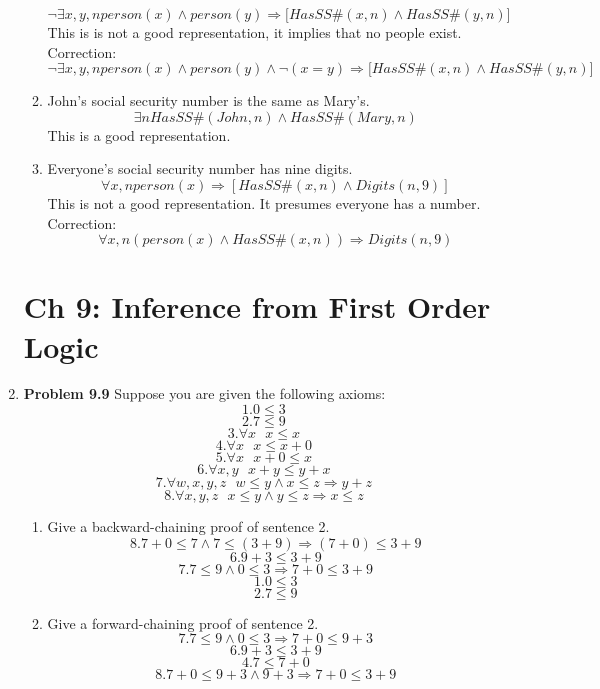 \documentclass[10pt]{article}
\begin{document}
\begin{enumerate}
\begin{enumerate}
    \[ \lnot \exists x,y,n person(x) \wedge person(y) \Rightarrow \big[HasSS\#(x,n) \wedge HasSS\#(y,n)\big] \]
    This is is not a good representation, it implies that no people exist. Correction:
    \[ \lnot \exists x,y,n person(x) \wedge person(y) \wedge \lnot(x=y) \Rightarrow \big[HasSS\#(x,n) \wedge HasSS\#(y,n)\big] \]
  \item John's social security number is the same as Mary's.
    \[ \exists n HasSS\#(John,n) \wedge HasSS\#(Mary,n) \]
    This is a good representation.
  \item Everyone's social security number has nine digits.
    \[ \forall x,n person(x) \Rightarrow [HasSS\#(x,n) \wedge Digits(n,9)] \]
    This is not a good representation. It presumes everyone has a number. Correction:
    \[ \forall x,n (person(x) \wedge HasSS\#(x,n)) \Rightarrow Digits(n,9) \]
  \end{enumerate}

\section*{Ch 9: Inference from First Order Logic}
\item \textbf{Problem 9.9} Suppose you are given the following axioms:
  \[1. 0 \le 3 \]
  \[2. 7 \le 9 \]
  \[3. \forall x \textrm{   } x \le x \]
  \[4. \forall x \textrm{   } x \le x + 0 \]
  \[5. \forall x \textrm{   } x + 0 \le x \]
  \[6. \forall x,y \textrm{   } x + y \le y + x \]
  \[7. \forall w,x,y,z \textrm{   } w \le y \wedge x \le z \Rightarrow y+z \]
  \[8. \forall x,y,z \textrm{   } x \le y \wedge y \le z \Rightarrow x \le z \]
  \begin{enumerate}
  \item Give a backward-chaining proof of sentence 2.
    \[8. 7 + 0 \le 7 \wedge 7 \le (3+9) \Rightarrow (7+0) \le 3 + 9 \]
    \[6. 9 + 3 \le 3 + 9 \]
    \[7. 7 \le 9 \wedge 0 \le 3 \Rightarrow 7 + 0 \le 3 +9 \]
    \[1. 0 \le 3 \]
    \[2. 7 \le 9 \]
  \item Give a forward-chaining proof of sentence 2.
    \[7. 7 \le 9 \wedge 0 \le 3 \Rightarrow 7 + 0 \le 9 + 3 \]
    \[6. 9 + 3 \le 3 + 9 \]
    \[4. 7 \le 7 + 0\]
    \[8. 7 + 0 \le 9 + 3 \wedge 9 + 3 \Rightarrow 7 + 0 \le 3 +9 \]
  \end{enumerate}


\end{enumerate}
\end{document}
